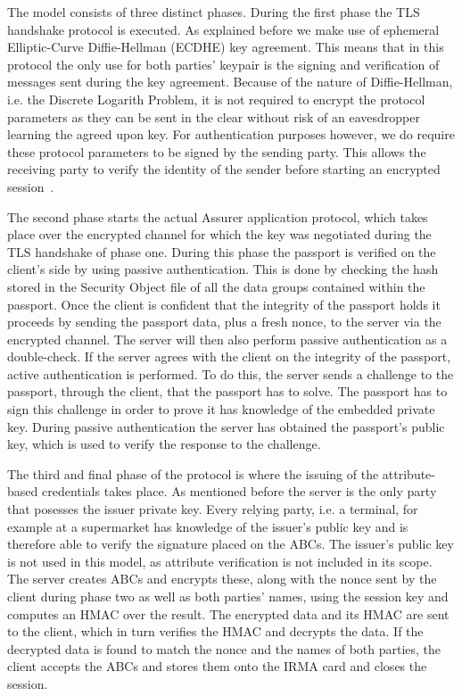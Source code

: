 The model consists of three distinct phases. During the first phase the TLS handshake protocol is executed. As explained before we make use of ephemeral Elliptic-Curve Diffie-Hellman (ECDHE) key agreement. This means that in this protocol the only use for both parties' keypair is the signing and verification of messages sent during the key agreement. Because of the nature of Diffie-Hellman, i.e. the Discrete Logarith Problem, it is not required to encrypt the protocol parameters as they can be sent in the clear without risk of an eavesdropper learning the agreed upon key. For authentication purposes however, we do require these protocol parameters to be signed by the sending party. This allows the receiving party to verify the identity of the sender before starting an encrypted session~\cite{tls1.2,tlsecc}.

The second phase starts the actual Assurer application protocol, which takes place over the encrypted channel for which the key was negotiated during the TLS handshake of phase one. During this phase the passport is verified on the client's side by using passive authentication. This is done by checking the hash stored in the Security Object file of all the data groups contained within the passport. Once the client is confident that the integrity of the passport holds it proceeds by sending the passport data, plus a fresh nonce, to the server via the encrypted channel. The server will then also perform passive authentication as a double-check. If the server agrees with the client on the integrity of the passport, active authentication is performed. To do this, the server sends a challenge to the passport, through the client, that the passport has to solve. The passport has to sign this challenge in order to prove it has knowledge of the embedded private key. During passive authentication the server has obtained the passport's public key, which is used to verify the response to the challenge.

The third and final phase of the protocol is where the issuing of the attribute-based credentials takes place. As mentioned before the server is the only party that posesses the issuer private key. Every relying party, i.e. a terminal, for example at a supermarket has knowledge of the issuer's public key and is therefore able to verify the signature placed on the ABCs. The issuer's public key is not used in this model, as attribute verification is not included in its scope. The server creates ABCs and encrypts these, along with the nonce sent by the client during phase two as well as both parties' names, using the session key and computes an HMAC over the result. The encrypted data and its HMAC are sent to the client, which in turn verifies the HMAC and decrypts the data. If the decrypted data is found to match the nonce and the names of both parties, the client accepts the ABCs and stores them onto the IRMA card and closes the session.

